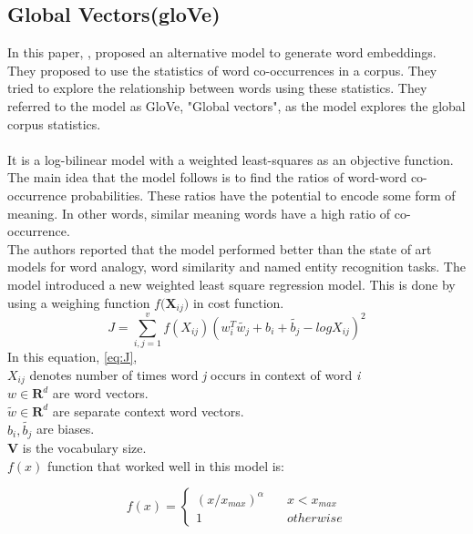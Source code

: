 \subsection{Global Vectors(gloVe)}
In this paper, \cite{pennington2014glove}, proposed an alternative model to generate word embeddings. They proposed to use the statistics of word co-occurrences in a corpus. They tried to explore the relationship between words using these statistics. They referred to the model as GloVe, "Global vectors", as the model explores the global corpus statistics.\\
\\
It is a log-bilinear model with a weighted least-squares as an objective function. The main idea that the model follows is to find the ratios of word-word co-occurrence probabilities. These ratios have the potential to encode some form of meaning. In other words, similar meaning words have a high ratio of co-occurrence.\\
The authors reported that the model performed better than the state of art models for word analogy, word similarity and named entity recognition tasks. The model introduced a new weighted least square regression model. This is done by using a weighing function $\mathit{f(\mathbf{X}_{ij}})$ in cost function.
\begin{equation}\label{eq:J}
\mathit{J = \sum_{i,j=1}^{v} f(X_{ij})(w_i^T \tilde{w_j}+b_i+\tilde{b_j}-log X_{ij})^2}
\end{equation}
In this equation, \ref{eq:J},\\
$\mathbf{\mathit{X_{ij}}}$ denotes number of times word \textit{j} occurs in context of word \textit{i}\\
$\mathit{w \in \mathbf{R}^d}$ are word vectors.\\
$\mathit{\tilde{w} \in \mathbf{R}^d}$ are separate context word vectors.\\ 
$\mathit{b_i, \tilde{b_j}}$ are biases.\\
$\mathbf{V}$ is the vocabulary size.\\
$\mathit{f(x)}$ function that worked well in this model is:
\begin{center}
	$$
	f(x) = \left\{
	\begin{array}{ll}
	(x/x_{max})^\alpha & \quad x < x_{max} \\
	1 & \quad otherwise
	\end{array}
	\right.
	$$
\end{center}
